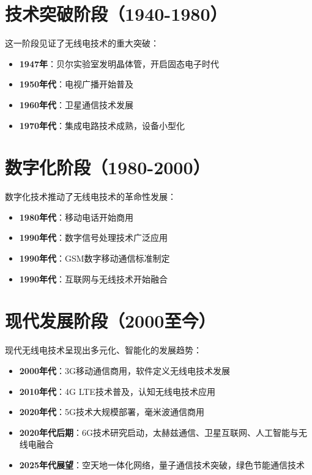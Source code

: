 \documentclass[12pt,UTF8]{ctexbook}
\begin{document}
\section{技术突破阶段（1940-1980）}

这一阶段见证了无线电技术的重大突破：

\begin{itemize}[leftmargin=3.5em]
    \item \textbf{1947年}：贝尔实验室发明晶体管，开启固态电子时代
    \item \textbf{1950年代}：电视广播开始普及
    \item \textbf{1960年代}：卫星通信技术发展
    \item \textbf{1970年代}：集成电路技术成熟，设备小型化
\end{itemize}

\section{数字化阶段（1980-2000）}

数字化技术推动了无线电技术的革命性发展：

\begin{itemize}[leftmargin=3.5em]
    \item \textbf{1980年代}：移动电话开始商用
    \item \textbf{1990年代}：数字信号处理技术广泛应用
    \item \textbf{1990年代}：GSM数字移动通信标准制定
    \item \textbf{1990年代}：互联网与无线技术开始融合
\end{itemize}

\section{现代发展阶段（2000至今）}

现代无线电技术呈现出多元化、智能化的发展趋势：

\begin{itemize}[leftmargin=3.5em]
    \item \textbf{2000年代}：3G移动通信商用，软件定义无线电技术发展
    \item \textbf{2010年代}：4G LTE技术普及，认知无线电技术应用
    \item \textbf{2020年代}：5G技术大规模部署，毫米波通信商用
    \item \textbf{2020年代后期}：6G技术研究启动，太赫兹通信、卫星互联网、人工智能与无线电融合
    \item \textbf{2025年代展望}：空天地一体化网络，量子通信技术突破，绿色节能通信技术
\end{itemize}
\end{document}
